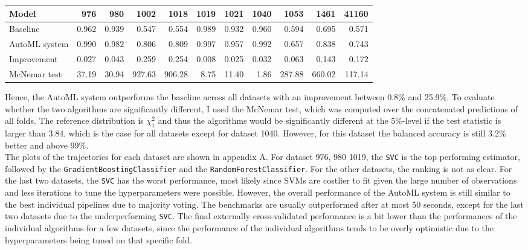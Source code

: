 \documentclass[11pt]{article}
\begin{document}
\vspace{-0.2cm}
\begin{table}[H]
\centering
\begin{tabular}{lrrrrrrrrrr}
\toprule
Model &   976 &   980 &  1002 &  1018 &  1019 &  1021 &  1040 &  1053 &  1461 &  41160 \\
\midrule
Baseline & 0.962 & 0.939 & 0.547 & 0.554 & 0.989 & 0.932 & 0.960 & 0.594 & 0.695 & 0.571 \\
AutoML system & 0.990 & 0.982 & 0.806 & 0.809 & 0.997 & 0.957 & 0.992 & 0.657 & 0.838 & 0.743 \\
\midrule
Improvement & 0.027 & 0.043 & 0.259 & 0.254 & 0.008 & 0.025 & 0.032 & 0.063 & 0.143 & 0.172 \\
McNemar test & 37.19 & 30.94 & 927.63 & 906.28 & 8.75 & 11.40 & 1.86 & 287.88 & 660.02 & 117.14 \\
\bottomrule
\end{tabular}
\end{table}
\vspace{-0.2cm}

Hence, the AutoML system outperforms the baseline across all datasets with an improvement between 0.8\% and 25.9\%. To evaluate whether the two algorithms are significantly different, I used the McNemar test, which was computed over the concatenated predictions of all folds. The reference distribution is $\chi_{1}^{2}$ and thus the algorithms would be significantly different at the 5\%-level if the test statistic is larger than 3.84, which is the case for all datasets except for dataset 1040. However, for this dataset the balanced accuracy is still 3.2\% better and above 99\%. \\

The plots of the trajectories for each dataset are shown in appendix A. For dataset 976, 980 1019, the \texttt{SVC} is the top performing estimator, followed by the \texttt{GradientBoostingClassifier} and the \texttt{RandomForestClassifier}. For the other datasets, the ranking is not as clear. For the last two datasets, the \texttt{SVC} has the worst performance, most likely since SVMs are costlier to fit given the large number of observations and less iterations to tune the hyperparameters were possible. However, the overall performance of the AutoML system is still similar to the best individual pipelines due to majority voting. The benchmarks are usually outperformed after at most 50 seconds, except for the last two datasets due to the underperforming \texttt{SVC}. The final externally cross-validated performance is a bit lower than the performances of the individual algorithms for a few datasets, since the performance of the individual algorithms tends to be overly optimistic due to the hyperparameters being tuned on that specific fold. \\
\end{document}
